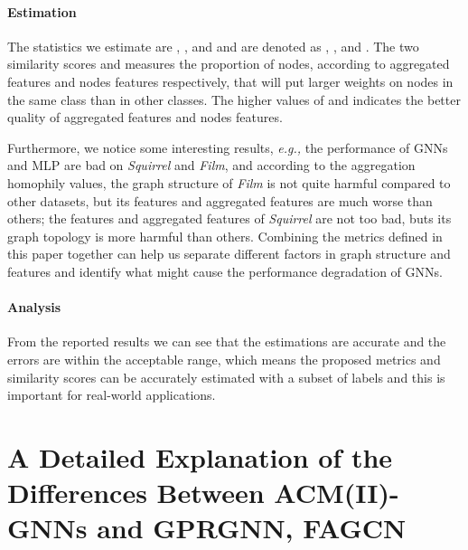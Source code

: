 \documentclass{article}
\newcommand\eg{\textit{e.g.,}}
\newcommand{\0}{{\boldsymbol{0}}}
\newcommand{\6}{{\partial}}
\newcommand{\8}{{\infty}}
\newcommand{\4}{{\nabla}}
\begin{document}
\paragraph{Estimation} The statistics we estimate are , ,  and  and are denoted as , ,  and . The two similarity scores  and  measures the proportion of nodes, according to aggregated features and nodes features respectively, that will put larger weights on nodes in the same class than in other classes. The higher values of  and  indicates the better quality of aggregated features and nodes features.

 Furthermore, we notice some interesting results, \eg{} the performance of GNNs and MLP are bad on \textit{Squirrel} and \textit{Film}, and according to the aggregation homophily values, the graph structure of \textit{Film} is not quite harmful compared to other datasets, but its features and aggregated features are much worse than others; the features and aggregated features of \textit{Squirrel} are not too bad, buts its graph topology is more harmful than others. Combining the metrics defined in this paper together can help us separate different factors in graph structure and features and identify what might cause the performance degradation of GNNs.
\fi
\paragraph{Analysis}
From the reported results we can see that the estimations are accurate and the errors are within the acceptable range, which means the proposed metrics and similarity scores can be accurately estimated with a subset of labels and this is important for real-world applications.


\section{A Detailed Explanation of the Differences Between ACM(II)-GNNs and GPRGNN, FAGCN}
\label{appendix:difference_with_sota_methods}
\end{document}
